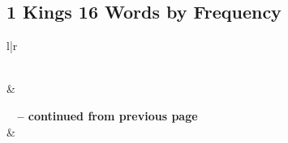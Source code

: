 

\subsection{1 Kings 16 Words by Frequency}


\normalsize
 
\begin{center}
\begin{longtable}{l|r}
\caption[1 Kings 16 Words by Frequency]{1 Kings 16 Words by Frequency}\label{table:WordsbyFrequency for 1 Kings 16} \\
\hline {} &  \\ \hline 
\endfirsthead
 
{{\bfseries \tablename\ \thetable{} -- continued from previous page}} \\  
\hline {} &  \\ \hline 
\endhead
 

\end{longtable}
\end{center}
